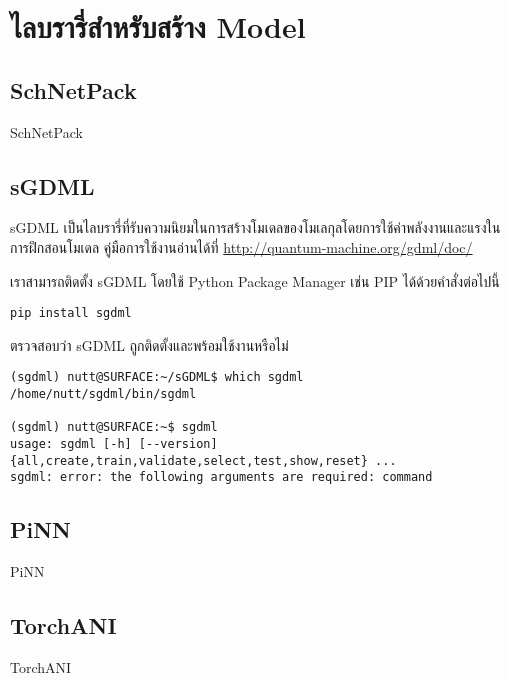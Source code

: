\section{ไลบรารี่สำหรับสร้าง Model}

\subsection{SchNetPack}

SchNetPack\cite{schutt2019}

\subsection{sGDML}

sGDML เป็นไลบรารี่ที่รับความนิยมในการสร้างโมเดลของโมเลกุลโดยการใช้ค่าพลังงานและแรงในการฝึกสอนโมเดล\cite{chmiela2019}
คู่มือการใช้งานอ่านได้ที่ \url{http://quantum-machine.org/gdml/doc/}

\noindent เราสามารถติดตั้ง sGDML โดยใช้ Python Package Manager เช่น PIP ได้ด้วยคำสั่งต่อไปนี้

\begin{lstlisting}[style=MyBash]
pip install sgdml
\end{lstlisting}

\noindent ตรวจสอบว่า sGDML ถูกติดตั้งและพร้อมใช้งานหรือไม่

\begin{lstlisting}[style=MyBash]
(sgdml) nutt@SURFACE:~/sGDML$ which sgdml
/home/nutt/sgdml/bin/sgdml

(sgdml) nutt@SURFACE:~$ sgdml
usage: sgdml [-h] [--version] {all,create,train,validate,select,test,show,reset} ...
sgdml: error: the following arguments are required: command
\end{lstlisting}



\subsection{PiNN}

PiNN\cite{shao2020}

\subsection{TorchANI}

TorchANI\cite{gao2020}

